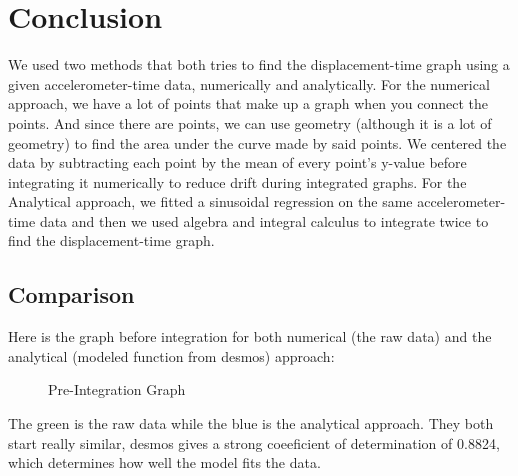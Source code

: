 \documentclass[12pt]{article}
\begin{document}
\section{Conclusion}
We used two methods that both tries to find the displacement-time graph using a given accelerometer-time data, numerically and analytically.
For the numerical approach, we have a lot of points that make up a graph when you connect the points. And since there are points, we can use geometry (although it is a lot of geometry) to find the area under the curve made by said points. We centered the data by subtracting each point by the mean of every point's y-value before integrating it numerically to reduce drift during integrated graphs.
For the Analytical approach, we fitted a sinusoidal regression on the same accelerometer-time data and then we used algebra and integral calculus to integrate twice to find the displacement-time graph.

\subsection{Comparison}


Here is the graph before integration for both numerical (the raw data) and the analytical (modeled function from desmos) approach:

\begin{figure}[H]
    \center
    \caption{Pre-Integration Graph}
    \label{fig:pre int graph}
\end{figure}

The green is the raw data while the blue is the analytical approach.
They both start really similar, desmos gives a strong coeeficient of determination of 0.8824, which determines how well the model fits the data.

%
\end{document}
